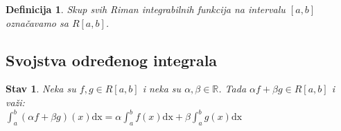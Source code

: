 \documentclass{article}
\newtheorem{definicija}{Definicija}[section]
\newtheorem{stav}{Stav}[section]
\begin{document}
\begin{defbox}
    \label{definicija_2.9}
    \begin{definicija}
        Skup svih Riman integrabilnih funkcija na intervalu $\left[a,b\right]$ označavamo sa $R\left[a, b\right]$.
    \end{definicija}
\end{defbox}

\subsection{Svojstva određenog integrala}

\begin{stavbox}
    \label{stav_2.4}
    \begin{stav}
        Neka su $f, g \in R\left[a, b\right]$ i neka su $\alpha, \beta \in \mathbb{R}$. Tada
        $\alpha f +\beta g \in R\left[a, b\right]$ i važi:\\
        $\displaystyle \int^b_a\left(\alpha f + \beta g\right)\left(x\right)\text{dx} = \alpha\int^b_af\left(x\right)\text{dx} + \beta\int^b_ag\left(x\right)\text{dx}$
    \end{stav}
\end{stavbox}
\end{document}

